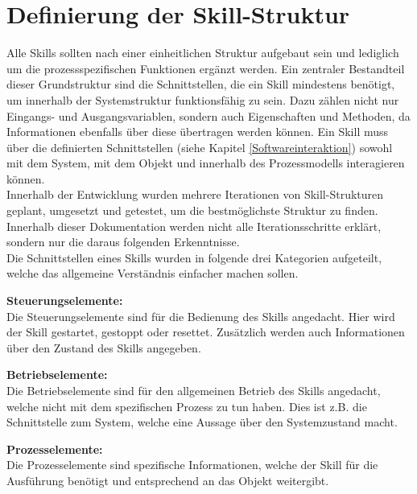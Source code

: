 \section{Definierung der Skill-Struktur} \label{Skillstruktur}
	Alle Skills sollten nach einer einheitlichen Struktur aufgebaut sein und lediglich um die prozessspezifischen Funktionen ergänzt werden. Ein zentraler Bestandteil dieser Grundstruktur sind die Schnittstellen, die ein Skill mindestens benötigt, um innerhalb der Systemstruktur funktionsfähig zu sein. Dazu zählen nicht nur Eingangs- und Ausgangsvariablen, sondern auch Eigenschaften und Methoden, da Informationen ebenfalls über diese übertragen werden können. Ein Skill muss über die definierten Schnittstellen (siehe Kapitel \ref{Softwareinteraktion}) sowohl mit dem System, mit dem Objekt und innerhalb des Prozessmodells interagieren können. 
	\\
	Innerhalb der Entwicklung wurden mehrere Iterationen von Skill-Strukturen geplant, umgesetzt und getestet, um die bestmöglichste Struktur zu finden. Innerhalb dieser Dokumentation werden nicht alle Iterationsschritte erklärt, sondern nur die daraus folgenden Erkenntnisse. 
	\\
	Die Schnittstellen eines Skills wurden in folgende drei Kategorien aufgeteilt, welche das allgemeine Verständnis einfacher machen sollen.
	
	\textbf{Steuerungselemente:}
	\vspace{2mm} 
	\\
	Die Steuerungselemente sind für die Bedienung des Skills angedacht. Hier wird der Skill gestartet, gestoppt oder resettet. Zusätzlich werden auch Informationen über den Zustand des Skills angegeben.
	
	\textbf{Betriebselemente:}
	\vspace{2mm} 
	\\
	Die Betriebselemente sind für den allgemeinen Betrieb des Skills angedacht, welche nicht mit dem spezifischen Prozess zu tun haben. Dies ist z.B. die Schnittstelle zum System, welche eine Aussage über den Systemzustand macht. 
	
	\textbf{Prozesselemente:}
	\vspace{2mm} 
	\\
	Die Prozesselemente sind spezifische Informationen, welche der Skill für die Ausführung benötigt und entsprechend  an das Objekt weitergibt. 
	\vspace{5mm} 
	
